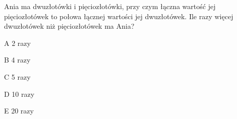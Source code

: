 \begin{tresc}
Ania ma dwuzłotówki i pięciozłotówki, przy czym łączna wartość jej pięciozłotówek to połowa łącznej wartości jej dwuzłotówek. Ile razy więcej dwuzłotówek niż pięciozłotówek ma Ania?
\end{tresc}
\begin{wariant}{A} 2 razy \end{wariant}
\begin{wariant}{B} 4 razy \end{wariant}
\begin{wariant}{C} 5 razy \end{wariant}
\begin{wariant}{D} 10 razy \end{wariant}
\begin{wariant}{E} 20 razy \end{wariant}
